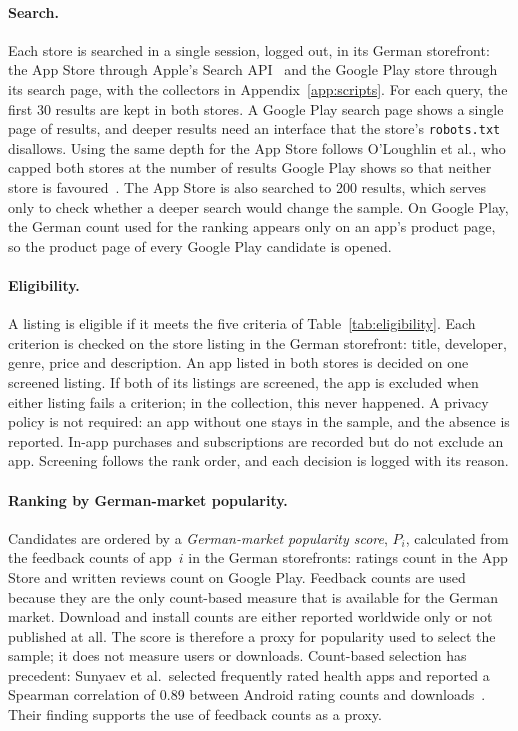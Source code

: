 \documentclass[twoside,its]{bossthesis}
\begin{document}
\paragraph{Search.} Each store is searched in a single session, logged out, in
its German storefront: the App Store through Apple's Search
API~\parencite{apple2022itunessearch} and the Google Play store through its
search page, with the collectors in Appendix~\ref{app:scripts}. For each query,
the first 30 results are kept in both stores. A Google Play search page shows
a single page of results, and deeper results need an interface that the store's
\texttt{robots.txt} disallows. Using the same depth for the App Store follows
O'Loughlin et al., who capped both stores at the number of results Google Play
shows so that neither store is favoured~\parencite{oloughlin2019reviewing}. The
App Store is also searched to 200 results, which serves only to check whether
a deeper search would change the sample. On Google Play, the German count used
for the ranking appears only on an app's product page, so the product page of
every Google Play candidate is opened.

\paragraph{Eligibility.} A listing is eligible if it meets the five criteria
of Table~\ref{tab:eligibility}. Each criterion is checked on the store listing
in the German storefront: title, developer, genre, price and description. An
app listed in both stores is decided on one screened listing. If both of its
listings are screened, the app is excluded when either listing fails a
criterion; in the collection, this never happened. A privacy policy is not
required: an app
without one stays in the sample, and the absence is reported. In-app purchases
and subscriptions are recorded but do not exclude an app. Screening follows the
rank order, and each decision is logged with its reason.

\paragraph{Ranking by German-market popularity.} Candidates are ordered by a
\emph{German-market popularity score}, $P_i$, calculated from the feedback
counts of app~$i$ in the German storefronts: ratings count in the App Store and
written reviews count on Google Play. Feedback counts are used because they are the
only count-based measure that is available for the German market. Download and
install counts are either reported worldwide only or not published at all.
The score is
therefore a proxy for popularity used to select the sample; it does not measure
users or downloads. Count-based selection has precedent: Sunyaev et
al.\ selected frequently rated health apps and reported a Spearman correlation
of 0.89 between Android rating counts and downloads~\parencite{sunyaev2015availability}.
Their finding supports the use of feedback counts as a proxy.
\end{document}
